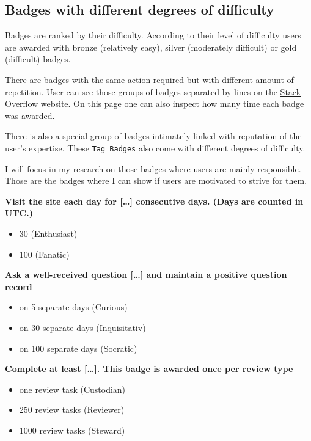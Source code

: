 \documentclass[]{book}
\providecommand{\tightlist}{%
  \setlength{\itemsep}{0pt}\setlength{\parskip}{0pt}}
\theoremstyle{definition}
\theoremstyle{definition}
\theoremstyle{definition}
\theoremstyle{remark}
\begin{document}
\subsection{Badges with different degrees of
difficulty}\label{badges-with-different-degrees-of-difficulty}

Badges are ranked by their difficulty. According to their level of
difficulty users are awarded with bronze (relatively easy), silver
(moderately difficult) or gold (difficult) badges.

There are badges with the same action required but with different amount
of repetition. User can see those groups of badges separated by lines on
the \href{https://stackoverflow.com/help/badges}{Stack Overflow
website}. On this page one can also inspect how many time each badge was
awarded.

There is also a special group of badges intimately linked with
reputation of the user's expertise. These \texttt{Tag\ Badges} also come
with different degrees of difficulty.

I will focus in my research on those badges where users are mainly
responsible. Those are the badges where I can show if users are
motivated to strive for them.

\textbf{Visit the site each day for {[}\ldots{}{]} consecutive days.
(Days are counted in UTC.)}

\begin{itemize}
\tightlist
\item
  30 (Enthusiast)
\item
  100 (Fanatic)
\end{itemize}

\textbf{Ask a well-received question {[}\ldots{}{]} and maintain a
positive question record}

\begin{itemize}
\tightlist
\item
  on 5 separate days (Curious)
\item
  on 30 separate days (Inquisitativ)
\item
  on 100 separate days (Socratic)
\end{itemize}

\textbf{Complete at least {[}\ldots{}{]}. This badge is awarded once per
review type}

\begin{itemize}
\tightlist
\item
  one review task (Custodian)
\item
  250 review tasks (Reviewer)
\item
  1000 review tasks (Steward)
\end{itemize}
\end{document}

